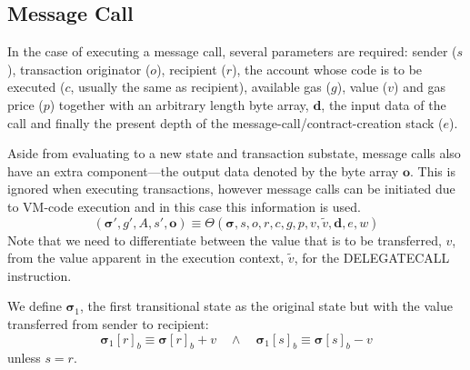 \documentclass[9pt,oneside]{amsart}
\begin{document}
\begin{multicols}{2}
\section{Message Call} \label{ch:call}
In the case of executing a message call, several parameters are required: sender ($s$), transaction originator ($o$), recipient ($r$), the account whose code is to be executed ($c$, usually the same as recipient), available gas ($g$), value ($v$) and gas price ($p$) together with an arbitrary length byte array, $\mathbf{d}$, the input data of the call and finally the present depth of the message-call/contract-creation stack ($e$).

Aside from evaluating to a new state and transaction substate, message calls also have an extra component---the output data denoted by the byte array $\mathbf{o}$. This is ignored when executing transactions, however message calls can be initiated due to VM-code execution and in this case this information is used.
\begin{equation}
(\boldsymbol{\sigma}', g', A, s', \mathbf{o}) \equiv \Theta(\boldsymbol{\sigma}, s, o, r, c, g, p, v, \tilde{v}, \mathbf{d}, e, w)
\end{equation}
Note that we need to differentiate between the value that is to be transferred, $v$, from the value apparent in the execution context, $\tilde{v}$, for the {\small DELEGATECALL} instruction.

We define $\boldsymbol{\sigma}_1$, the first transitional state as the original state but with the value transferred from sender to recipient:
\begin{equation}
\boldsymbol{\sigma}_1[r]_b \equiv \boldsymbol{\sigma}[r]_b + v \quad\wedge\quad \boldsymbol{\sigma}_1[s]_b \equiv \boldsymbol{\sigma}[s]_b - v
\end{equation}
unless $s = r$.


\end{multicols}
\end{document}
